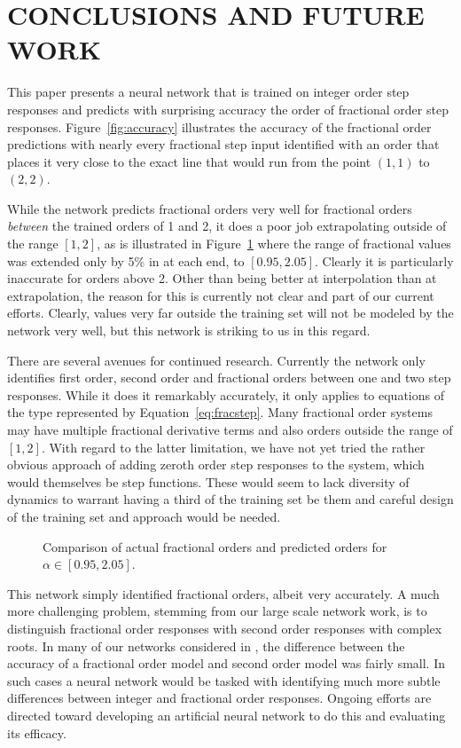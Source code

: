 \section{CONCLUSIONS AND FUTURE WORK}
\label{sec:conclusions}

This paper presents a neural network that is trained on integer order step
responses and predicts with surprising accuracy the order of fractional order
step responses. Figure~\ref{fig:accuracy} illustrates the accuracy of the
fractional order predictions with nearly every fractional step input identified
with an order that places it very close to the exact line that would run from
the point $(1,1)$ to $(2,2)$. 

While the network predicts fractional orders very well for fractional orders
\emph{between} the trained orders of 1 and 2, it does a poor job extrapolating
outside of the range $[1,2]$, as is illustrated in Figure~\ref{fig:extrapolate}
where the range of fractional values was extended only by 5\% in at each end, to
$\left[ 0.95, 2.05 \right]$. Clearly it is particularly inaccurate for orders
above 2.  Other than being better at interpolation than at extrapolation, the
reason for this is currently not clear and part of our current efforts. Clearly,
values very far outside the training set will not be modeled by the network very
well, but this network is striking to us in this regard.  

There are several avenues for continued research. Currently the network only
identifies first order, second order and fractional orders between one and two
step responses. While it does it remarkably accurately, it only applies to
equations of the type represented by Equation~\ref{eq:fracstep}. Many fractional
order systems may have multiple fractional derivative terms and also orders
outside the range of $[1,2]$. With regard to the latter limitation, we have not
yet tried the rather obvious approach of adding zeroth order step responses to
the system, which would themselves be step functions. These would seem to lack
diversity of dynamics to warrant having a third of the training set be them and
careful design of the training set and approach would be needed. 

\begin{figure}
\centering

\vspace*{-5pt}
\caption{Comparison of actual fractional orders and predicted orders for $\alpha
\in \left[0.95,2.05\right]$.}
\label{fig:extrapolate}
\end{figure}

This network simply identified fractional orders, albeit very accurately. A much
more challenging problem, stemming from our large scale network work, is to
distinguish fractional order responses with second order responses with complex
roots. In many of our networks considered in
\cite{goodwinemed2023,goodwinemmar2023}, the difference between the accuracy of
a fractional order model and second order model was fairly small. In such cases
a neural network would be tasked with identifying much more subtle differences
between integer and fractional order responses. Ongoing efforts are directed
toward developing an artificial neural network to do this and evaluating its
efficacy.  
